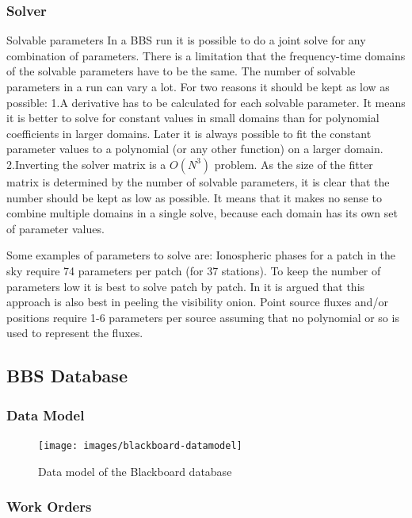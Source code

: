 \documentclass[10pt]{lofar}
\begin{document}
\subsubsection{Solver}
\label{subsubsec:design-solver}
Solvable parameters
In a BBS run it is possible to do a joint solve for any combination of parameters. There is a limitation that the frequency-time domains of the solvable parameters have to be the same.
The number of solvable parameters in a run can vary a lot. For two reasons it should be kept as low as possible:
1.A derivative has to be calculated for each solvable parameter. It means it is better to solve for constant values in small domains than for polynomial coefficients in larger domains. Later it is always possible to fit the constant parameter values to a polynomial (or any other function) on a larger domain.
2.Inverting the solver matrix is a $O(N^3)$ problem. As the size of the fitter matrix is determined by the number of solvable parameters, it is clear that the number should be kept as low as possible.
It means that it makes no sense to combine multiple domains in a single solve, because each domain has its own set of parameter values.

Some examples of parameters to solve are:
Ionospheric phases for a patch in the sky require 74 parameters per patch (for 37 stations).
To keep the number of parameters low it is best to solve patch by patch. In  it is argued that this approach is also best in peeling the visibility onion.
Point source fluxes and/or positions require 1-6 parameters per source assuming that no polynomial or so is used to represent the fluxes.

\subsection{BBS Database}
\label{subsec:design-database}

\subsubsection{Data Model}
\label{subsubsec:design-data-model}
\begin{figure}[!ht]
\texttt{[image: images/blackboard-datamodel]}
\caption{Data model of the Blackboard database}
\end{figure}

\subsubsection{Work Orders}
\label{subsubsec:design-work-orders}
\end{document}
